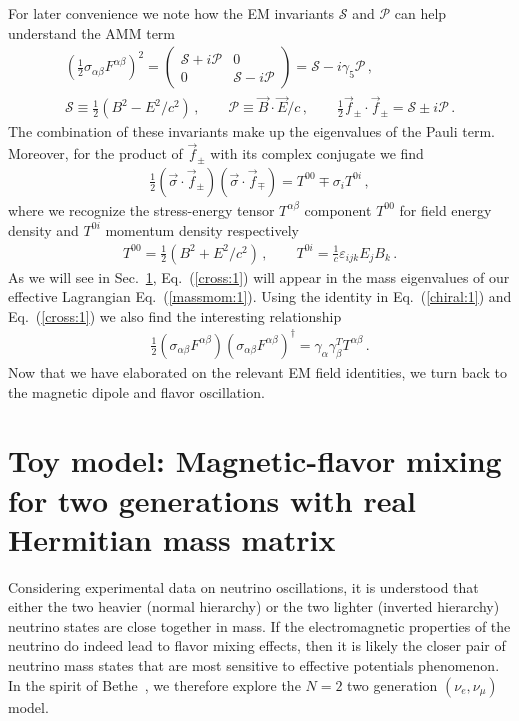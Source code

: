 \documentclass[addchapnum]{ws-rv961x669} %
\newcommand{\req}[1]{Eq.~(\ref{#1})}
\newcommand{\rsec}[1]{Sec.~{\ref{#1}}}
\begin{document}
For later convenience we note how the EM invariants $\mathcal{S}$ and $\mathcal{P}$ can help understand the AMM term 
\begin{align}
    \label{invar:1}
    \left(\frac{1}{2}\sigma_{\alpha\beta}F^{\alpha\beta}\right)^{2}=
    \begin{pmatrix}
        \mathcal{S}+i\mathcal{P} & 0\\
        0 & \mathcal{S}-i\mathcal{P}
    \end{pmatrix}=\mathcal{S}-i\gamma_{5}\mathcal{P}\,,\\
    \mathcal{S}\equiv\frac{1}{2}\left(B^{2}-E^{2}/c^{2}\right)\,,\qquad
    \mathcal{P}\equiv\vec{B}\cdot\vec{E}/c\,,\qquad
    \frac{1}{2}\vec{f}_{\pm}\cdot\vec{f}_{\pm}=\mathcal{S}\pm i\mathcal{P}\,.
\end{align}
The combination of these invariants make up the eigenvalues of the Pauli term. Moreover, for the product of $\vec{f}_{\pm}$ with its complex conjugate we find
\begin{align}
        \label{cross:1}
        \frac{1}{2}\left(\vec{\sigma}\cdot\vec{f}_{\pm}\right)\left(\vec{\sigma}\cdot\vec{f}_{\mp}\right)=T^{00}\mp \sigma_{i}T^{0i}\,,
\end{align}
where we recognize the stress-energy tensor $T^{\alpha\beta}$ component $T^{00}$ for field energy density and $T^{0i}$ momentum density respectively
\begin{align}
    T^{00}=\frac{1}{2}\left(B^{2}+E^{2}/c^{2}\right)\,,\qquad
    T^{0i}=\frac{1}{c}\varepsilon_{ijk}E_{j}B_{k}\,.
\end{align}
As we will see in \rsec{sec:toy}, \req{cross:1} will appear in the mass eigenvalues of our effective Lagrangian \req{massmom:1}. Using the identity in \req{chiral:1} and \req{cross:1} we also find the interesting relationship
\begin{align}
    \label{cross:2}
    \frac{1}{2}\left(\sigma_{\alpha\beta}F^{\alpha\beta}\right)\left(\sigma_{\alpha\beta}F^{\alpha\beta}\right)^{\dag}=
    \gamma_{\alpha}\gamma_{\beta}^{T}T^{\alpha\beta}\,.
\end{align}
Now that we have elaborated on the relevant EM field identities, we turn back to the magnetic dipole and flavor oscillation.

\section{Toy model: Magnetic-flavor mixing for two generations with real Hermitian mass matrix}
\label{sec:toy}
Considering experimental data on neutrino oscillations, it is understood that either the two heavier (normal hierarchy) or the two lighter (inverted hierarchy) neutrino states are close together in mass. If the electromagnetic properties of the neutrino do indeed lead to flavor mixing effects, then it is likely the closer pair of neutrino mass states that are most sensitive to effective potentials phenomenon. In the spirit of Bethe~\cite{Bethe:1986ej}, we therefore explore the $N=2$ two generation $(\nu_{e},\nu_{\mu})$ model.
\end{document}
